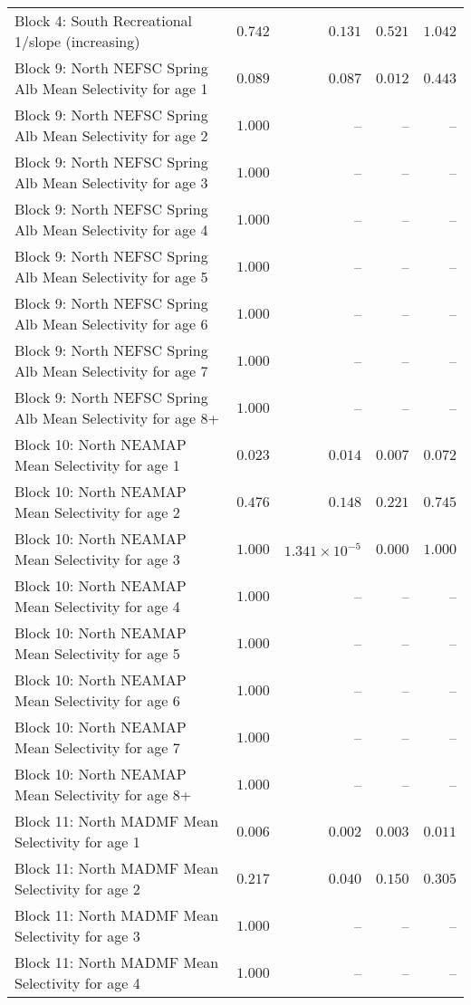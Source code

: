 \documentclass[
]{article}
\begin{document}
\begin{landscape}
\begin{longtable}[t]{lrrrr}
Block 4: South Recreational 1/slope (increasing) & $0.742$ & $0.131$ & $0.521$ & $1.042$\\
Block 9: North NEFSC Spring Alb Mean Selectivity for age 1 & $0.089$ & $0.087$ & $0.012$ & $0.443$\\
Block 9: North NEFSC Spring Alb Mean Selectivity for age 2 & $1.000$ & -- & -- & --\\
Block 9: North NEFSC Spring Alb Mean Selectivity for age 3 & $1.000$ & -- & -- & --\\
\addlinespace
Block 9: North NEFSC Spring Alb Mean Selectivity for age 4 & $1.000$ & -- & -- & --\\
Block 9: North NEFSC Spring Alb Mean Selectivity for age 5 & $1.000$ & -- & -- & --\\
Block 9: North NEFSC Spring Alb Mean Selectivity for age 6 & $1.000$ & -- & -- & --\\
Block 9: North NEFSC Spring Alb Mean Selectivity for age 7 & $1.000$ & -- & -- & --\\
Block 9: North NEFSC Spring Alb Mean Selectivity for age 8+ & $1.000$ & -- & -- & --\\
\addlinespace
Block 10: North NEAMAP Mean Selectivity for age 1 & $0.023$ & $0.014$ & $0.007$ & $0.072$\\
Block 10: North NEAMAP Mean Selectivity for age 2 & $0.476$ & $0.148$ & $0.221$ & $0.745$\\
Block 10: North NEAMAP Mean Selectivity for age 3 & $1.000$ & $1.341\times 10^{-5}$ & $0.000$ & $1.000$\\
Block 10: North NEAMAP Mean Selectivity for age 4 & $1.000$ & -- & -- & --\\
Block 10: North NEAMAP Mean Selectivity for age 5 & $1.000$ & -- & -- & --\\
\addlinespace
Block 10: North NEAMAP Mean Selectivity for age 6 & $1.000$ & -- & -- & --\\
Block 10: North NEAMAP Mean Selectivity for age 7 & $1.000$ & -- & -- & --\\
Block 10: North NEAMAP Mean Selectivity for age 8+ & $1.000$ & -- & -- & --\\
Block 11: North MADMF Mean Selectivity for age 1 & $0.006$ & $0.002$ & $0.003$ & $0.011$\\
Block 11: North MADMF Mean Selectivity for age 2 & $0.217$ & $0.040$ & $0.150$ & $0.305$\\
\addlinespace
Block 11: North MADMF Mean Selectivity for age 3 & $1.000$ & -- & -- & --\\
Block 11: North MADMF Mean Selectivity for age 4 & $1.000$ & -- & -- & --\\

\end{longtable}
\end{landscape}
\end{document}
